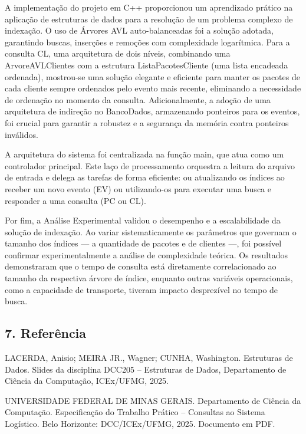 \documentclass[
  12pt,
]{article}
\begin{document}
A implementação do projeto em C++ proporcionou um aprendizado prático na
aplicação de estruturas de dados para a resolução de um problema
complexo de indexação. O uso de Árvores AVL auto-balanceadas foi a
solução adotada, garantindo buscas, inserções e remoções com
complexidade logarítmica. Para a consulta CL, uma arquitetura de dois
níveis, combinando uma ArvoreAVLClientes com a estrutura
ListaPacotesCliente (uma lista encadeada ordenada), mostrou-se uma
solução elegante e eficiente para manter os pacotes de cada cliente
sempre ordenados pelo evento mais recente, eliminando a necessidade de
ordenação no momento da consulta. Adicionalmente, a adoção de uma
arquitetura de indireção no BancoDados, armazenando ponteiros para os
eventos, foi crucial para garantir a robustez e a segurança da memória
contra ponteiros inválidos.

A arquitetura do sistema foi centralizada na função main, que atua como
um controlador principal. Este laço de processamento orquestra a leitura
do arquivo de entrada e delega as tarefas de forma eficiente: ou
atualizando os índices ao receber um novo evento (EV) ou utilizando-os
para executar uma busca e responder a uma consulta (PC ou CL).

Por fim, a Análise Experimental validou o desempenho e a escalabilidade
da solução de indexação. Ao variar sistematicamente os parâmetros que
governam o tamanho dos índices --- a quantidade de pacotes e de clientes
---, foi possível confirmar experimentalmente a análise de complexidade
teórica. Os resultados demonstraram que o tempo de consulta está
diretamente correlacionado ao tamanho da respectiva árvore de índice,
enquanto outras variáveis operacionais, como a capacidade de transporte,
tiveram impacto desprezível no tempo de busca.

\newpage

\subsection{7. Referência}\label{referuxeancia}

LACERDA, Anisio; MEIRA JR., Wagner; CUNHA, Washington. Estruturas de
Dados. Slides da disciplina DCC205 -- Estruturas de Dados, Departamento
de Ciência da Computação, ICEx/UFMG, 2025.

UNIVERSIDADE FEDERAL DE MINAS GERAIS. Departamento de Ciência da
Computação. Especificação do Trabalho Prático -- Consultas ao Sistema
Logístico. Belo Horizonte: DCC/ICEx/UFMG, 2025. Documento em PDF.
\end{document}
